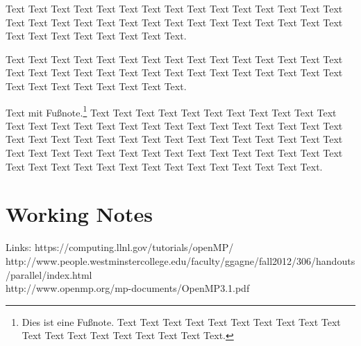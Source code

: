 \documentclass{lni}
\begin{document}
Text Text Text Text Text Text Text Text Text Text Text Text Text Text Text Text Text Text Text Text Text Text Text Text Text Text Text Text Text Text Text Text Text Text Text Text Text Text.


Text Text Text Text Text Text Text Text Text Text Text Text Text Text Text Text Text Text Text Text Text Text Text Text Text Text Text Text Text Text Text Text Text Text Text Text Text Text.

Text mit Fußnote.\footnote{Dies ist eine Fußnote. Text Text Text Text Text Text Text Text Text Text Text Text Text Text Text Text Text Text Text.} Text \cite{Ez99,ABC01} Text Text Text Text Text Text Text Text Text Text Text Text Text Text Text Text Text Text Text Text Text Text Text Text Text Text Text Text  Text Text Text Text Text Text Text Text Text Text Text Text Text Text Text Text Text Text Text Text Text Text Text Text Text Text Text Text Text Text Text Text Text Text Text Text Text Text Text Text Text.

\pagebreak

\section{Working Notes}
Links: 
https://computing.llnl.gov/tutorials/openMP/ \\
http://www.people.westminstercollege.edu/faculty/ggagne/fall2012/306/handouts/parallel/index.html \\
http://www.openmp.org/mp-documents/OpenMP3.1.pdf \\




\end{document}
